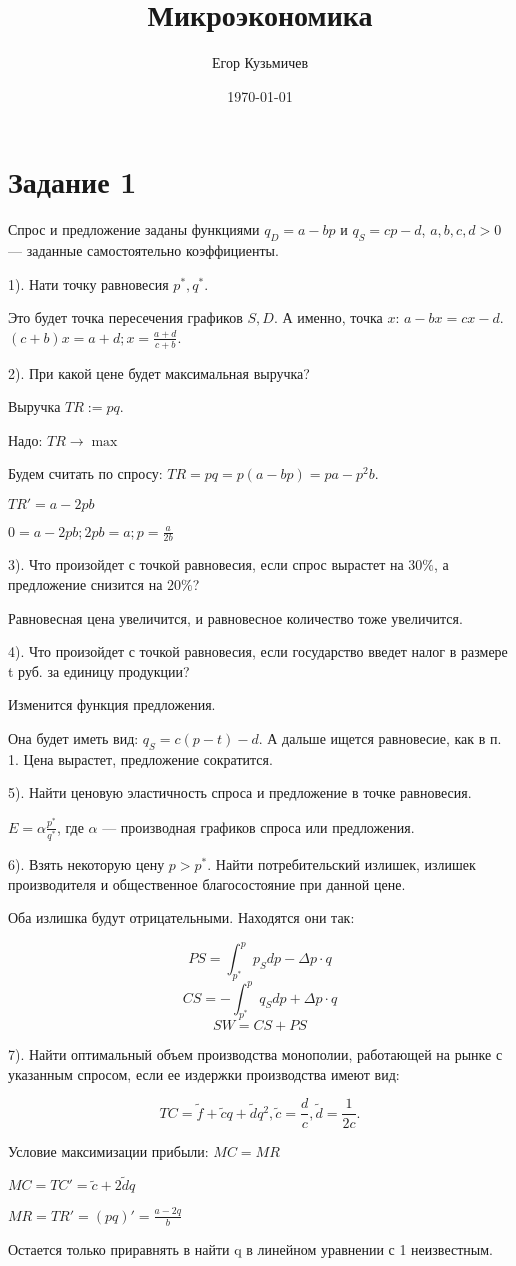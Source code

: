 \documentclass[a4paper,12pt]{article}
\author{Егор Кузьмичев}
\title{Микроэкономика}
\date{\today}
\begin{document}

\maketitle

\section{Задание 1}
Спрос и предложение заданы функциями $q_D=a-bp$ и $q_S=cp-d$, $a,b,c,d>0$ --- заданные самостоятельно коэффициенты.

1). Нати точку равновесия $p^*, q^*$.

Это будет точка пересечения графиков $S, D$.
А именно, точка $x$: $a-bx=cx-d$.
$(c+b)x=a+d; x=\frac{a+d}{c+b}$. 

2). При какой цене будет максимальная выручка?

Выручка $TR:=pq$.

Надо: $TR\to\max$

Будем считать по спросу: $TR=pq=p(a-bp)=pa-p^2b$.

$TR'=a-2pb$

$0=a-2pb; 2pb=a; p=\frac{a}{2b}$


3). Что произойдет с точкой равновесия, если спрос вырастет на $30\%$, а предложение снизится на $20\%$?

Равновесная цена увеличится, и равновесное количество тоже увеличится.

4). Что произойдет с точкой равновесия, если государство введет налог в размере t руб. за единицу продукции?

Изменится функция предложения.

Она будет иметь вид:
$q_S=c(p-t)-d$. А дальше ищется равновесие, как в п. 1.
Цена вырастет, предложение сократится.

5). Найти ценовую эластичность спроса и предложение в точке равновесия.

$E=\alpha\frac{p^*}{q^*}$, где $\alpha$ --- производная графиков спроса или предложения.

6). Взять некоторую цену $p>p^*$. Найти потребительский излишек, излишек производителя и общественное благосостояние при данной цене.

Оба излишка будут отрицательными.
Находятся они так:

$$
PS=\int_{p^*}^p p_S dp - \Delta p \cdot q
$$
$$
CS=-\int_{p^*}^p q_S dp + \Delta p \cdot q
$$
$$
SW=CS+PS
$$

7). Найти оптимальный объем производства монополии, работающей на рынке с указанным спросом, если ее издержки производства имеют вид:

$$
TC=\tilde f + \tilde cq + \tilde dq^2, \tilde c = \frac{d}{c}, \tilde d=\frac{1}{2c}.
$$

Условие максимизации прибыли:
$MC=MR$

$MC=TC'=\tilde c + 2\tilde dq$

$MR=TR'=(pq)'=\frac{a-2q}{b}$

Остается только приравнять в найти q в линейном уравнении с 1 неизвестным. 
\end{document}
